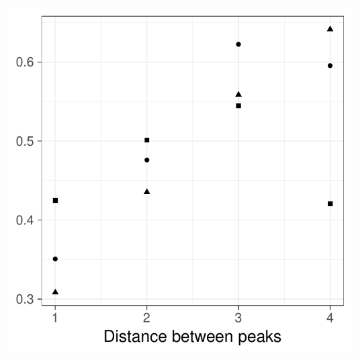 \begin{figure}[htbp]
\begin{subfigure}[b]{0.49\textwidth}
        \includegraphics[width=\textwidth]{results/by_two_peaks/peak-drift-vs-risk-peak-gap}
        \caption{}
        \label{fig:other_measures:p1.4_100_G:peak_drift}
    \end{subfigure}


\end{figure}
